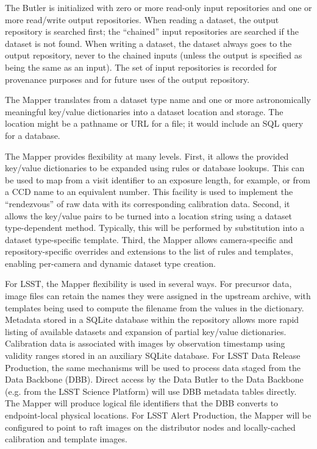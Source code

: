 \documentclass[DM,lsstdraft,toc]{lsstdoc}
\begin{document}
The Butler is initialized with zero or more read-only input repositories and
one or more read/write output repositories. When reading a dataset, the output
repository is searched first; the ``chained'' input repositories are searched
if the dataset is not found. When writing a dataset, the dataset always goes to
the output repository, never to the chained inputs (unless the output is
specified as being the same as an input).  The set of input repositories is
recorded for provenance purposes and for future uses of the output repository.

The Mapper translates from a dataset type name and one or more
astronomically meaningful key/value dictionaries into a dataset location
and storage. The location might be a pathname or URL for a file; it
would include an SQL query for a database.

The Mapper provides flexibility at many levels. First, it allows the
provided key/value dictionaries to be expanded using rules or database
lookups. This can be used to map from a visit identifier to an exposure
length, for example, or from a CCD name to an equivalent number. This
facility is used to implement the ``rendezvous'' of raw data with its
corresponding calibration data. Second, it allows the key/value pairs to
be turned into a location string using a dataset type-dependent method.
Typically, this will be performed by substitution into a dataset
type-specific template. Third, the Mapper allows camera-specific and
repository-specific overrides and extensions to the list of rules and
templates, enabling per-camera and dynamic dataset type creation.

For LSST, the Mapper flexibility is used in several ways.  For precursor data,
image files can retain the names they were assigned in the upstream archive,
with templates being used to compute the filename from the values in the
dictionary.  Metadata stored in a SQLite database within the repository allows
more rapid listing of available datasets and expansion of partial key/value
dictionaries.  Calibration data is associated with images by observation
timestamp using validity ranges stored in an auxiliary SQLite database.  For
LSST Data Release Production, the same mechanisms will be used to process data
staged from the Data Backbone (DBB).  Direct access by the Data Butler to the
Data Backbone (e.g. from the LSST Science Platform) will use DBB metadata
tables directly.  The Mapper will produce logical file identifiers that the DBB
converts to endpoint-local physical locations.  For LSST Alert Production, the
Mapper will be configured to point to raft images on the distributor nodes and
locally-cached calibration and template images.
\end{document}
